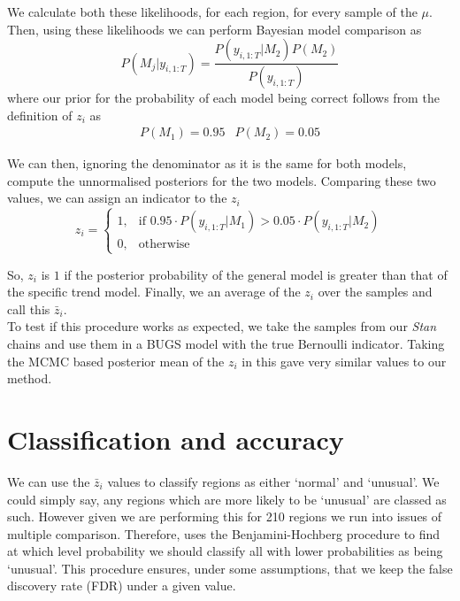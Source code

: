 \documentclass[11pt]{report}
\begin{document}
We calculate both these likelihoods, for each region, for every sample of the $\mu$. Then, using these likelihoods we can perform Bayesian model comparison as
\begin{equation}
P(M_j | y_{i, 1:T}) = \frac{P(y_{i, 1:T} | M_2) P(M_2)}{P(y_{i, 1:T})}
\end{equation}
where our prior for the probability of each model being correct follows from the definition of $z_i$ as
\begin{equation}
\begin{array}{cc}
P(M_1) = 0.95 & P(M_2) = 0.05
\end{array}
\end{equation}

We can then, ignoring the denominator as it is the same for both models, compute the unnormalised posteriors for the two models. Comparing these two values, we can assign an indicator to the $z_i$
\begin{equation}
z_i = \left\{%
\begin{array}{ll}
1, & \text{if } 0.95 \cdot P(y_{i,1:T} | M_1) > 0.05 \cdot P(y_{i,1:T} | M_2) \\
0, & \text{otherwise}
\end{array}\right.
\end{equation}

So, $z_i$ is $1$ if the posterior probability of the general model is greater than that of the specific trend model. Finally, we an average of the $z_i$ over the samples and call this $\bar{z}_i$. \\

To test if this procedure works as expected, we take the samples from our \emph{Stan} chains and use them in a BUGS model with the true Bernoulli indicator. Taking the MCMC based posterior mean of the $z_i$ in this gave very similar values to our method. 



\section{Classification and accuracy}

We can use the $\bar{z}_i$ values to classify regions as either `normal' and `unusual'. We could simply say, any regions which are more likely to be `unusual' are classed as such. However given we are performing this for 210 regions we run into issues of multiple comparison. Therefore, \citet{baystdetect} uses the Benjamini-Hochberg procedure to find at which level probability we should classify all with lower probabilities as being `unusual'. This procedure ensures, under some assumptions, that we keep the false discovery rate (FDR) under a given value. \\
\end{document}
